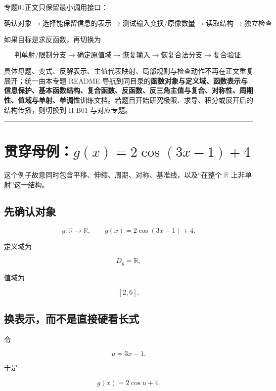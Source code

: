 \documentclass[11pt,a4paper]{ctexart}
\begin{document}
专题01正文只保留最小调用接口：

\[
\boxed{
\text{确认对象}
\to
\text{选择能保留信息的表示}
\to
\text{测试输入变换/原像数量}
\to
\text{读取结构}
\to
\text{独立检查}
}
\]

如果目标是求反函数，再切换为

\[
\boxed{
\text{判单射/限制分支}
\to
\text{确定原值域}
\to
\text{恢复输入}
\to
\text{恢复合法分支}
\to
\text{复合验证}
}.
\]

具体母题、变式、反解表示、主值代表映射、局部规则与检查动作不再在正文重复展开；统一由本专题 README 导航到同目录的\textbf{函数对象与定义域、函数表示与信息保护、基本函数结构、复合函数、反函数、反三角主值与复合、对称性、周期性、值域与单射、单调性}训练文档。若题目开始研究极限、求导、积分或展开后的结构传播，则切换到 H-B01 与对应专题。

\begin{center}\rule{0.5\linewidth}{0.5pt}\end{center}

\section{\texorpdfstring{贯穿母例：\(g(x)=2\cos(3x-1)+4\)}{贯穿母例：g(x)=2\textbackslash cos(3x-1)+4}}\label{ux8d2fux7a7fux6bcdux4f8bgx2cos3x-14}

这个例子故意同时包含平移、伸缩、周期、对称、基准线，以及“在整个 \(\mathbb R\) 上非单射”这一结构。

\subsection{先确认对象}\label{ux5148ux786eux8ba4ux5bf9ux8c61}

\[
g:\mathbb R\to\mathbb R,
\qquad
g(x)=2\cos(3x-1)+4.
\]

定义域为

\[
D_g=\mathbb R,
\]

值域为

\[
[2,6].
\]

\subsection{换表示，而不是直接硬看长式}\label{ux6362ux8868ux793aux800cux4e0dux662fux76f4ux63a5ux786cux770bux957fux5f0f}

令

\[
u=3x-1.
\]

于是

\[
g(x)=2\cos u+4.
\]
\end{document}
